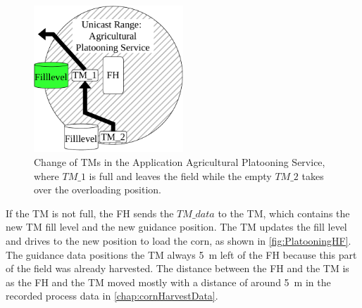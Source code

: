 \begin{figure}[]%
	\centering
	\includegraphics[width=0.5\textwidth]{figures/platoonFULL}
	\caption{Change of \acf{TM}s in the Application Agricultural Platooning Service, where $TM\_1$
	is full and leaves the field while the empty $TM\_2$ takes over the overloading position.}
	\label{fig:PlatooningFull}%
\end{figure}

If the \ac{TM} is not full, the \ac{FH} sends the $TM\_data$ to the \ac{TM},
which contains the new \ac{TM} fill level and the new guidance position.
The \ac{TM} updates the fill level and drives to the new position to load the corn, as shown in \autoref{fig:PlatooningHF}.
The guidance data positions the \ac{TM} always \SI{5}{\metre} left of the \ac{FH} because this part of the field was already harvested.
The distance between the \ac{FH} and the \ac{TM} is  as the \ac{FH} and the \ac{TM} moved mostly with a distance of around \SI{5}{\metre} in
the recorded process data in \autoref{chap:cornHarvestData}.

